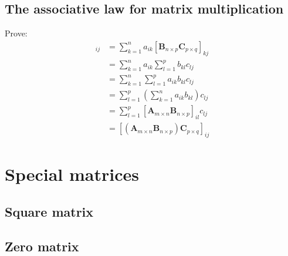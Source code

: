 \documentclass[oneside]{book}
\begin{document}
\subsection{The associative law for matrix multiplication}{
    \cor{
        \[\mathbf{A}_{m \times n}(\mathbf{B}_{n \times p}\mathbf{C}_{p \times q})=(\mathbf{A}_{m \times n}\mathbf{B}_{n \times p})\mathbf{C}_{p \times q}\]
    }

    Prove:
        \begin{align}
            [\mathbf{A}_{m \times n}(\mathbf{B}_{n \times p}\mathbf{C}_{p \times q}))]_{ij}&=\sum_{k=1}^{n}a_{ik}[\mathbf{B}_{n \times p}\mathbf{C}_{p \times q}]_{kj}\\
                &=\sum_{k=1}^{n}a_{ik}\sum_{l=1}^{p}b_{kl}c_{lj}\\
                &=\sum_{k=1}^{n}\sum_{l=1}^{p}a_{ik}b_{kl}c_{lj}\\
                &=\sum_{l=1}^{p}(\sum_{k=1}^{n}a_{ik}b_{kl})c_{lj}\\
                &=\sum_{l=1}^{p}[\mathbf{A}_{m \times n}\mathbf{B}_{n \times p}]_{il}c_{lj}\\
                &=[(\mathbf{A}_{m \times n}\mathbf{B}_{n \times p})\mathbf{C}_{p \times q}]_{ij}
        \end{align}
}



\section{Special matrices}

\subsection{Square matrix}{
}

\subsection{Zero matrix}{

    \cor{
        \[\mathbf{0}_{p \times m}\mathbf{A}_{m \times n}=\mathbf{0}_{p \times n}\]
        \[\mathbf{A}_{m \times n}\mathbf{0}_{n \times p}=\mathbf{0}_{m \times p}\]
    }
}
\end{document}
